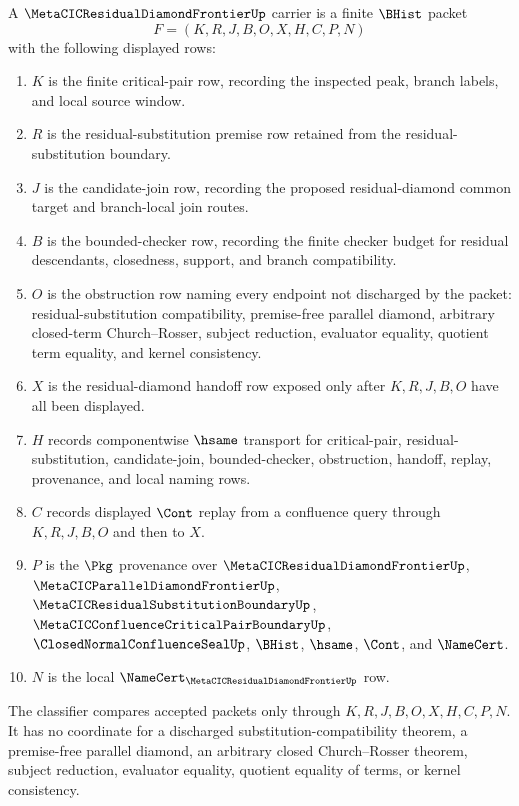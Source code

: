 \begin{definition}
\label{def:metacic-residual-diamond-frontier-carrier}
A $\MetaCICResidualDiamondFrontierUp$ carrier is a finite $\BHist$ packet
$$
F=(K,R,J,B,O,X,H,C,P,N)
$$
with the following displayed rows:
\begin{enumerate}
\item $K$ is the finite critical-pair row, recording the inspected peak, branch labels, and local source window.
\item $R$ is the residual-substitution premise row retained from the residual-substitution boundary.
\item $J$ is the candidate-join row, recording the proposed residual-diamond common target and branch-local join routes.
\item $B$ is the bounded-checker row, recording the finite checker budget for residual descendants, closedness, support, and branch compatibility.
\item $O$ is the obstruction row naming every endpoint not discharged by the packet: residual-substitution compatibility, premise-free parallel diamond, arbitrary closed-term Church--Rosser, subject reduction, evaluator equality, quotient term equality, and kernel consistency.
\item $X$ is the residual-diamond handoff row exposed only after $K,R,J,B,O$ have all been displayed.
\item $H$ records componentwise $\hsame$ transport for critical-pair, residual-substitution, candidate-join, bounded-checker, obstruction, handoff, replay, provenance, and local naming rows.
\item $C$ records displayed $\Cont$ replay from a confluence query through $K,R,J,B,O$ and then to $X$.
\item $P$ is the $\Pkg$ provenance over $\MetaCICResidualDiamondFrontierUp$, $\MetaCICParallelDiamondFrontierUp$, $\MetaCICResidualSubstitutionBoundaryUp$, $\MetaCICConfluenceCriticalPairBoundaryUp$, $\ClosedNormalConfluenceSealUp$, $\BHist$, $\hsame$, $\Cont$, and $\NameCert$.
\item $N$ is the local $\NameCert_{\MetaCICResidualDiamondFrontierUp}$ row.
\end{enumerate}
The classifier compares accepted packets only through $K,R,J,B,O,X,H,C,P,N$. It has no coordinate for a discharged substitution-compatibility theorem, a premise-free parallel diamond, an arbitrary closed Church--Rosser theorem, subject reduction, evaluator equality, quotient equality of terms, or kernel consistency.
\end{definition}

